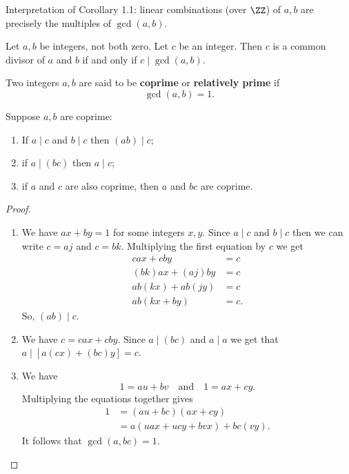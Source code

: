 \documentclass[12pt, a4paper]{article}
\begin{document}
\begin{mdnote}
    Interpretation of Corollary 1.1: linear combinations (over \(\ZZ\)) of \(a,b\) are precisely the multiples of \(\gcd(a,b)\).
\end{mdnote}

\begin{corollary}
    Let \(a,b\) be integers, not both zero. Let \(c\) be an integer. Then \(c\) is a common divisor of \(a\) and \(b\) if and only if \(c\mid \gcd(a,b)\).
\end{corollary}

\begin{definition}
    Two integers \(a,b\) are said to be \textbf{coprime} or \textbf{relatively prime} if \[\gcd(a,b)=1.\]
\end{definition}

\begin{mdlemma}
    Suppose \(a,b\) are coprime:
    \begin{enumerate}
        \item If \(a\mid c\) and \(b\mid c\) then \((ab)\mid c\);
        \item if \(a\mid (bc)\) then \(a\mid c\);
        \item if \(a\) and \(c\) are also coprime, then \(a\) and \(bc\) are coprime.
    \end{enumerate}
\end{mdlemma}

\begin{proof}
    \begin{enumerate}
        \item We have \(ax+by =1\) for some integers \(x,y\). Since \(a \mid c\) and \(b \mid c\) then we can write \(c =aj\) and \(c=bk\). Multiplying the first equation by \(c\) we get 
        \[\begin{aligned}
            cax +cby &=c \\
            (bk)ax + (aj)by &= c \\
            ab(kx)+ab(jy) &= c\\
            ab(kx+by) &=c.
        \end{aligned}\]
        So, \((ab) \mid c\).
        \item We have \(c=cax+cby\). Since \(a \mid (bc)\) and \(a \mid a\) we get that \(a \mid [a(cx)+(bc)y] =c\).
        \item We have 
        \[1= au +bv \quad \text{and} \quad 1=ax+cy.\]
        Multiplying the equations together gives
        \[\begin{aligned}
            1&=(au+bc)(ax+cy)\\
            &= a(uax +ucy + bvx) +bc(vy).
        \end{aligned}\]
        It follows that \(\gcd(a,bc)=1\).
    \end{enumerate}
\end{proof}
\end{document}
